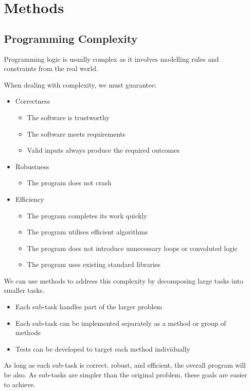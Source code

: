 \documentclass{article}
\begin{document}
\section{Methods}\label{section:methods}
\subsection{Programming Complexity}
Programming logic is usually complex as it involves modelling rules
and constraints from the real world.

When dealing with complexity, we must guarantee:
\begin{itemize}
    \item Correctness
          \begin{itemize}
              \item The software is trustworthy
              \item The software meets requirements
              \item Valid inputs always produce the required outcomes
          \end{itemize}
    \item Robustness
          \begin{itemize}
              \item The program does not crash
          \end{itemize}
    \item Efficiency
          \begin{itemize}
              \item The program completes its work quickly
              \item The program utilises efficient algorithms
              \item The program does not introduce unnecessary loops or convoluted logic
              \item The program uses existing standard libraries
          \end{itemize}
\end{itemize}
We can use methods to address this complexity by decomposing large tasks into smaller tasks.
\begin{itemize}
    \item Each sub-task handles part of the larger problem
    \item Each sub-task can be implemented separately as a method or group of methods
    \item Tests can be developed to target each method individually
\end{itemize}
As long as each sub-task is correct, robust, and efficient, the overall program will be also.
As sub-tasks are simpler than the original problem, these goals are easier to achieve.
\end{document}
